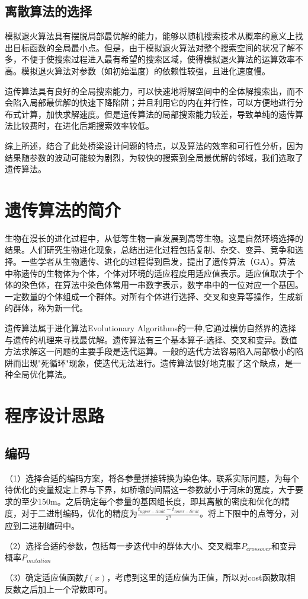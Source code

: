 \documentclass[forprint]{WHUBachelor}
\begin{document}
\subsection{离散算法的选择}
模拟退火算法具有摆脱局部最优解的能力，能够以随机搜索技术从概率的意义上找出目标函数的全局最小点。但是，由于模拟退火算法对整个搜索空间的状况了解不多，不便于使搜索过程进入最有希望的搜索区域，使得模拟退火算法的运算效率不高。模拟退火算法对参数（如初始温度）的依赖性较强，且进化速度慢。\par
遗传算法具有良好的全局搜索能力，可以快速地将解空间中的全体解搜索出，而不会陷入局部最优解的快速下降陷阱；并且利用它的内在并行性，可以方便地进行分布式计算，加快求解速度。但是遗传算法的局部搜索能力较差，导致单纯的遗传算法比较费时，在进化后期搜索效率较低。\par
综上所述，结合了此处桥梁设计问题的特点，以及算法的效率和可行性分析，因为结果随参数的波动可能较为剧烈，为较快的搜索到全局最优解的邻域，我们选取了遗传算法。
\section{遗传算法的简介}
生物在漫长的进化过程中，从低等生物一直发展到高等生物。这是自然环境选择的结果。人们研究生物进化现象，总结出进化过程包括复制、杂交、变异、竞争和选择。一些学者从生物遗传、进化的过程得到启发，提出了遗传算法（GA）。算法中称遗传的生物体为个体，个体对环境的适应程度用适应值表示。适应值取决于个体的染色体，在算法中染色体常用一串数字表示，数字串中的一位对应一个基因。一定数量的个体组成一个群体。对所有个体进行选择、交叉和变异等操作，生成新的群体，称为新一代。\par
遗传算法属于进化算法Evolutionary Algorithms的一种,它通过模仿自然界的选择与遗传的机理来寻找最优解。遗传算法有三个基本算子:选择、交叉和变异。数值方法求解这一问题的主要手段是迭代运算。一般的迭代方法容易陷入局部极小的陷阱而出现"死循环"现象，使迭代无法进行。遗传算法很好地克服了这个缺点，是一种全局优化算法。\par
\section{程序设计思路}
\subsection{编码}
（1）选择合适的编码方案，将各参量拼接转换为染色体。联系实际问题，为每个待优化的变量规定上界与下界，如桥墩的间隔这一参数就小于河床的宽度，大于要求的至少150m。之后确定每个参量的基因组长度，即其离散的密度和优化的精度，对于二进制编码，优化的精度为$\frac{t_{upper-limit}-t_{lower-limit}}{2^n}$。将上下限中的点等分，对应到二进制编码中。\par
（2）选择合适的参数，包括每一步迭代中的群体大小、交叉概率$P_{crossover}$和变异概率$P_{mutation}$\par
（3）确定适应值函数$f(x)$，考虑到这里的适应值为正值，所以对cost函数取相反数之后加上一个常数即可。
\end{document}
